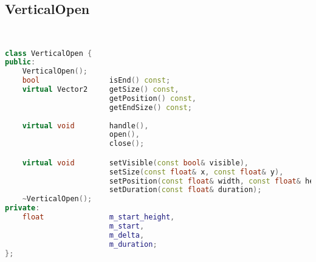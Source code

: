 \subsection{VerticalOpen}
\begin{lstlisting}[language=C++]


class VerticalOpen {
public:
    VerticalOpen();
    bool                isEnd() const;
    virtual Vector2     getSize() const,
                        getPosition() const,
                        getEndSize() const;
    
    virtual void        handle(),
                        open(),
                        close();

    virtual void        setVisible(const bool& visible),
                        setSize(const float& x, const float& y),
                        setPosition(const float& width, const float& height),
                        setDuration(const float& duration);
    ~VerticalOpen();
private:
    float               m_start_height,
                        m_start,
                        m_delta,
                        m_duration;
};





\end{lstlisting}
